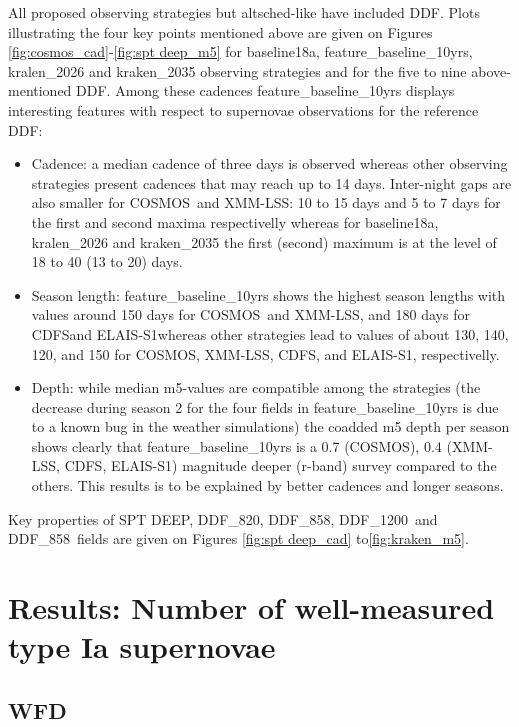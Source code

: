 \documentclass [11pt,a4paper]{article}
\newcommand{\cosmos}{COSMOS}
\newcommand{\xmmlss}{XMM-LSS}
\newcommand{\cdfs}{CDFS}
\newcommand{\elais}{ELAIS-S1}
\newcommand{\spt}{SPT DEEP}
\newcommand{\ddfa}{DDF\_820}
\newcommand{\ddfb}{DDF\_858}
\newcommand{\ddfc}{DDF\_1200}
\begin{document}
All proposed observing strategies but altsched-like have included DDF.
Plots illustrating the four key points mentioned above are given on Figures \ref{fig:cosmos_cad}-\ref{fig:spt deep_m5} for baseline18a, feature\_baseline\_10yrs, kralen\_2026 and kraken\_2035 observing strategies and for the five to nine above-mentioned DDF. Among these cadences feature\_baseline\_10yrs displays interesting features with respect to supernovae observations for the reference DDF:
\begin{itemize}
\item Cadence: a median cadence of three days is observed whereas other observing strategies present cadences that may reach up to 14 days. Inter-night gaps are also smaller for \cosmos~and \xmmlss: 10 to 15 days and 5 to 7 days for the first and second maxima respectivelly whereas  for baseline18a, kralen\_2026 and kraken\_2035 the first (second) maximum is at the level of 18 to 40 (13 to 20) days.  
\item Season length: feature\_baseline\_10yrs shows the highest season lengths with values around 150 days for \cosmos~and \xmmlss, and 180 days for \cdfs and \elais whereas other strategies lead to values of about 130, 140, 120, and 150 for \cosmos, \xmmlss, \cdfs, and \elais, respectivelly.
\item Depth: while median m5-values are compatible among the strategies (the decrease during season 2 for the four fields in  feature\_baseline\_10yrs is due to a known bug in the weather simulations) the coadded m5 depth per season shows clearly that feature\_baseline\_10yrs is a 0.7 (\cosmos), 0.4 (\xmmlss, \cdfs, \elais) magnitude deeper (r-band) survey compared to the others. This results is to be explained by better cadences and longer seasons.
 
\end{itemize}
Key properties of \spt, \ddfa, \ddfb, \ddfc~and \ddfb~fields are given on Figures \ref{fig:spt deep_cad} to\ref{fig:kraken_m5}.


\section{Results: Number of well-measured type Ia supernovae}

\subsection {WFD}
\end{document}
